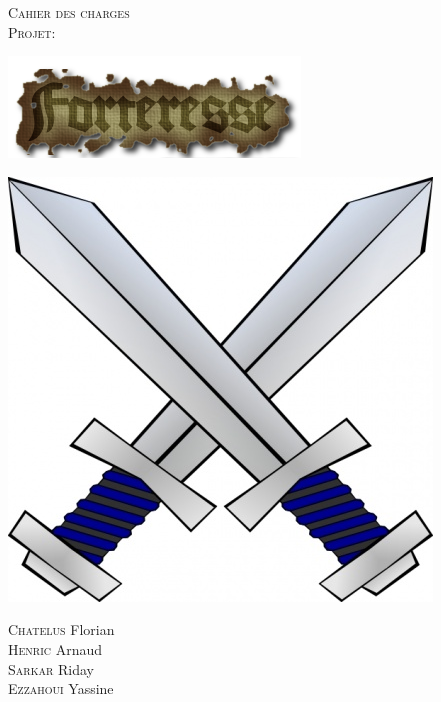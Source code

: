 \documentclass[a4paper, 12pt]{article}
\begin{document}
\begin{titlepage}
  \begin{sffamily}
  \begin{center}


    \textsc{\Huge Cahier des charges}\\[3cm]

    \textsc{\LARGE Projet:}\\[1.5cm]

	\centerline{\includegraphics{coollogo_com-19602433.png}}
	\vfill{
	\centerline{\includegraphics[scale=0.4]{crossed-swords-clip-art-48219.jpg}}}

    \begin{minipage}{0.4\textwidth}
      \begin{flushleft} \large	
      
      \end{flushleft}
    \end{minipage}
	\begin{flushleft}\vfill
      {
       \textsc{Chatelus} Florian\\
       \textsc{Henric} Arnaud\\
       \textsc{Sarkar} Riday\\
       \textsc{Ezzahoui} Yassine }
    \end{flushleft}	
  \end{center}
  \end{sffamily}
\end{titlepage}
\tableofcontents
\newpage
\end{document}
